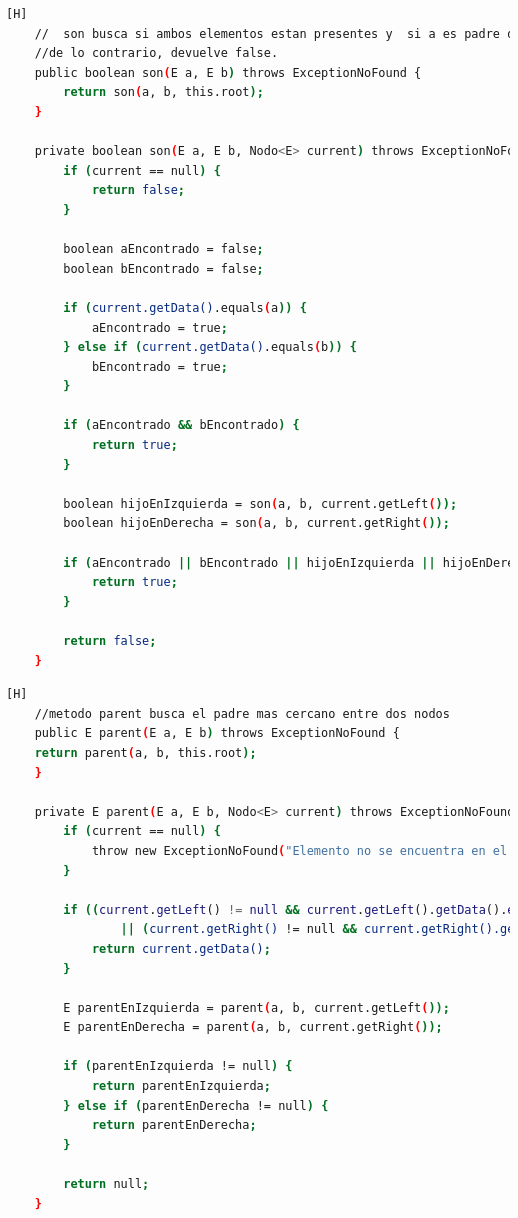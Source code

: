 \documentclass{article}
\begin{document}
	\begin{lstlisting}[language=bash,caption={Clase AVL: Método son()}][H]
	//  son busca si ambos elementos estan presentes y  si a es padre de b, 
    //de lo contrario, devuelve false. 
    public boolean son(E a, E b) throws ExceptionNoFound {
        return son(a, b, this.root);
    }

    private boolean son(E a, E b, Nodo<E> current) throws ExceptionNoFound {
        if (current == null) {
            return false;
        }

        boolean aEncontrado = false;
        boolean bEncontrado = false;

        if (current.getData().equals(a)) {
            aEncontrado = true;
        } else if (current.getData().equals(b)) {
            bEncontrado = true;
        }

        if (aEncontrado && bEncontrado) {
            return true;
        }

        boolean hijoEnIzquierda = son(a, b, current.getLeft());
        boolean hijoEnDerecha = son(a, b, current.getRight());

        if (aEncontrado || bEncontrado || hijoEnIzquierda || hijoEnDerecha) {
            return true;
        }

        return false;
    }
	\end{lstlisting}
	\begin{lstlisting}[language=bash,caption={Clase AVL: Método parent()}][H]
	//metodo parent busca el padre mas cercano entre dos nodos
    public E parent(E a, E b) throws ExceptionNoFound {
    return parent(a, b, this.root);
    }

    private E parent(E a, E b, Nodo<E> current) throws ExceptionNoFound {
        if (current == null) {
            throw new ExceptionNoFound("Elemento no se encuentra en el arbol");
        }

        if ((current.getLeft() != null && current.getLeft().getData().equals(a) && current.getRight() != null && current.getRight().getData().equals(b))
                || (current.getRight() != null && current.getRight().getData().equals(a) && current.getLeft() != null && current.getLeft().getData().equals(b))) {
            return current.getData();
        }

        E parentEnIzquierda = parent(a, b, current.getLeft());
        E parentEnDerecha = parent(a, b, current.getRight());

        if (parentEnIzquierda != null) {
            return parentEnIzquierda;
        } else if (parentEnDerecha != null) {
            return parentEnDerecha;
        }

        return null;
    }
	\end{lstlisting}
		
\end{document}
